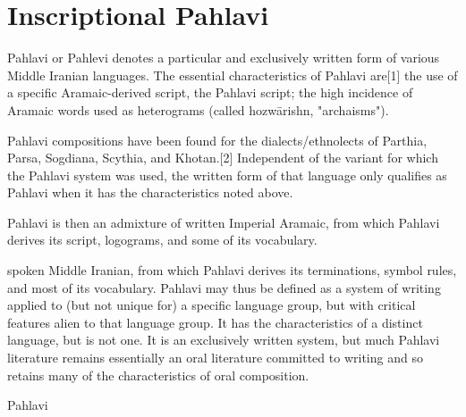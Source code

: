 \section{Inscriptional Pahlavi}
\label{s:inscriptionalpahlavi}

Pahlavi or Pahlevi denotes a particular and exclusively written form of various Middle Iranian languages. The essential characteristics of Pahlavi are[1]
the use of a specific Aramaic-derived script, the Pahlavi script;
the high incidence of Aramaic words used as heterograms (called hozwārishn, "archaisms").

Pahlavi compositions have been found for the dialects/ethnolects of Parthia, Parsa, Sogdiana, Scythia, and Khotan.[2] Independent of the variant for which the Pahlavi system was used, the written form of that language only qualifies as Pahlavi when it has the characteristics noted above.


Pahlavi is then an admixture of
written Imperial Aramaic, from which Pahlavi derives its script, logograms, and some of its vocabulary.

spoken Middle Iranian, from which Pahlavi derives its terminations, symbol rules, and most of its vocabulary.
Pahlavi may thus be defined as a system of writing applied to (but not unique for) a specific language group, but with critical features alien to that language group. It has the characteristics of a distinct language, but is not one. It is an exclusively written system, but much Pahlavi literature remains essentially an oral literature committed to writing and so retains many of the characteristics of oral composition.

\begin{scriptexample}[]{Pahlavi}
\end{scriptexample}